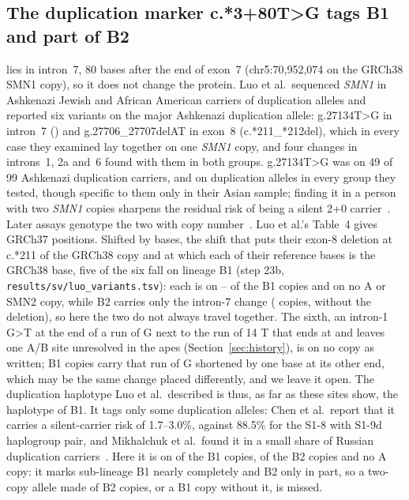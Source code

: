 \subsection{The duplication marker c.*3+80T>G tags B1 and part of B2}\label{sec:marker}
\cpe{} lies in intron~7, 80 bases after the end of exon~7 (chr5:70{,}952{,}074 on the GRCh38 SMN1 copy), so it does not
change the protein. Luo et al.\ sequenced \emph{SMN1} in Ashkenazi Jewish and African American carriers of duplication
alleles and reported six variants on the major Ashkenazi duplication allele: g.27134T>G in intron~7 (\cpe{}) and
g.27706\_27707delAT in exon~8 (c.*211\_*212del), which in every case they examined lay together on one \emph{SMN1} copy, and
four changes in introns~1, 2a and~6 found with them in both groups. g.27134T>G was on 49 of 99 Ashkenazi duplication
carriers, and on duplication alleles in every group they tested, though specific to them only in their Asian
sample; finding it in a person with two \emph{SMN1} copies sharpens the residual risk of being a silent 2+0
carrier~\cite{luo2014}. Later assays genotype the two with copy number~\cite{feng2017,milligan2021,mikhalchuk2025}.
Luo et al.'s Table~4 gives GRCh37 positions. Shifted by \luoShift{} bases, the shift that puts their exon-8 deletion at
c.*211 of the GRCh38 copy and at which each of their reference bases is the GRCh38 base, five of the six fall on
lineage B1 (step 23b, \texttt{results/sv/luo\_variants.tsv}): each is on \luoBoneLo--\luoBoneHi{} of the \linBone{} B1
copies and on no A or SMN2 copy, while B2 carries only the intron-7 change (\luoBtwoMk{} copies, without the
deletion), so here the two do not always travel together. The sixth, an intron-1 G>T at the end of a run of G next to
the run of 14 T that ends at \rdUnresSite{} and leaves one A/B site unresolved in the apes (Section~\ref{sec:history}), is on no copy as written; \luoIntronOneB{} B1 copies carry that run of G
shortened by one base at its other end, which may be the same change placed differently, and we leave it open. The
duplication haplotype Luo et al.\ described is thus, as far as these sites show, the haplotype of B1.
It tags only some duplication alleles: Chen et al.\
report that it carries a silent-carrier risk of 1.7--3.0\%, against 88.5\% for the S1-8 with S1-9d haplogroup pair, and
Mikhalchuk et al.\ found it in a small share of Russian duplication carriers~\cite{chen2023,mikhalchuk2025}. Here it is
on \linBoneMk{} of the \linBone{} B1 copies, \linBtwoMk{} of the \linBtwo{} B2 copies and no A copy: it marks
sub-lineage B1 nearly completely and B2 only in part, so a two-copy allele made of B2 copies, or a B1 copy without it,
is missed.

